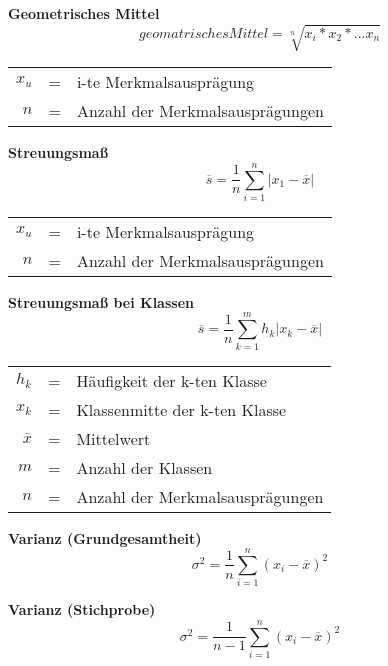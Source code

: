 \documentclass[11pt,twocolumn,fleqn]{article}
\begin{document}
\textbf{Geometrisches Mittel}
\begin{equation*}
geomatrisches Mittel = \sqrt[n]{x_i*x_2*...x_n}
\end{equation*}
\begin{center}\begin{tabular}{rcl}
   $x_u$ & = & i-te Merkmalsausprägung  \\
   $n$   & = & Anzahl der Merkmalsausprägungen \\
\end{tabular}\end{center}

\textbf{Streuungsmaß}
\begin{equation*}
\overline{s}=\frac{1}{n}\sum^n_{i=1}|x_1-\overline{x}|
\end{equation*}
\begin{center}\begin{tabular}{rcl}
   $x_u$ & = & i-te Merkmalsausprägung  \\
   $n$   & = & Anzahl der Merkmalsausprägungen \\
\end{tabular}\end{center}

\textbf{Streuungsmaß bei Klassen}
\begin{equation*}
\overline{s}=\frac{1}{n}\sum^m_{k=1}h_k|x_k-\overline{x}|
\end{equation*}
\begin{center}\begin{tabular}{rcl}
   $h_k$ & = & Häufigkeit der k-ten Klasse  \\
   $x_k$ & = & Klassenmitte der k-ten Klasse \\
   $\overline{x}$ & = & Mittelwert \\
   $m$   & = & Anzahl der Klassen \\
   $n$   & = &  Anzahl der Merkmalsausprägungen \\
\end{tabular}\end{center}

\textbf{Varianz (Grundgesamtheit)}
\begin{equation*}
\sigma^2=\frac{1}{n}\sum^n_{i=1}(x_i-\overline{x})^2
\end{equation*}

\textbf{Varianz (Stichprobe)}
\begin{equation*}
\sigma^2=\frac{1}{n-1}\sum^n_{i=1}(x_i-\overline{x})^2
\end{equation*}
\end{document}

